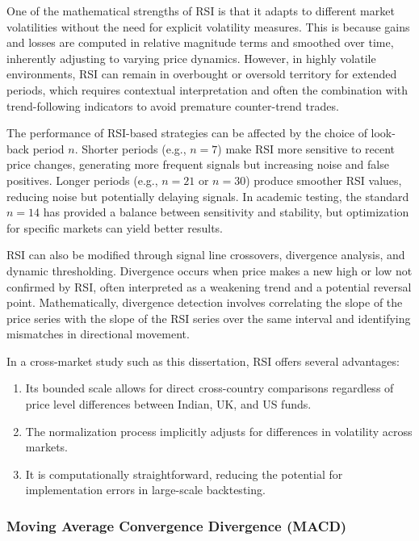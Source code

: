 One of the mathematical strengths of RSI is that it adapts to different market volatilities without the need for explicit volatility measures. This is because gains and losses are computed in relative magnitude terms and smoothed over time, inherently adjusting to varying price dynamics. However, in highly volatile environments, RSI can remain in overbought or oversold territory for extended periods, which requires contextual interpretation and often the combination with trend-following indicators to avoid premature counter-trend trades.

The performance of RSI-based strategies can be affected by the choice of look-back period $n$. Shorter periods (e.g., $n=7$) make RSI more sensitive to recent price changes, generating more frequent signals but increasing noise and false positives. Longer periods (e.g., $n=21$ or $n=30$) produce smoother RSI values, reducing noise but potentially delaying signals. In academic testing, the standard $n=14$ has provided a balance between sensitivity and stability, but optimization for specific markets can yield better results.

RSI can also be modified through signal line crossovers, divergence analysis, and dynamic thresholding. Divergence occurs when price makes a new high or low not confirmed by RSI, often interpreted as a weakening trend and a potential reversal point. Mathematically, divergence detection involves correlating the slope of the price series with the slope of the RSI series over the same interval and identifying mismatches in directional movement.

In a cross-market study such as this dissertation, RSI offers several advantages:
\begin{enumerate}
    \item Its bounded scale allows for direct cross-country comparisons regardless of price level differences between Indian, UK, and US funds.
    \item The normalization process implicitly adjusts for differences in volatility across markets.
    \item It is computationally straightforward, reducing the potential for implementation errors in large-scale backtesting.
\end{enumerate}





\subsubsection{Moving Average Convergence Divergence (MACD)}

